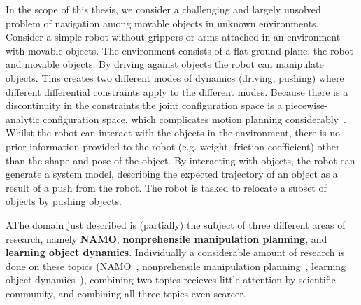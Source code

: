 In the scope of this thesis, we consider a challenging and largely unsolved problem of navigation among movable objects in unknown environments. Consider a simple robot without grippers or arms attached in an environment with movable objects. The environment consists of a flat ground plane, the robot and movable objects. By driving against objects the robot can manipulate objects.\bs
{}
This creates two different modes of dynamics (driving,  pushing) where different differential constraints apply to the different modes. Because there is a discontinuity in the constraints the joint configuration space is a piecewise-analytic configuration space, which complicates motion planning considerably~\cite{vega-brown_asymptotically_2020}. Whilst the robot can interact with the objects in the environment, there is no prior information provided to the robot (e.g. weight, friction coefficient) other than the shape and pose of the object. By interacting with objects, the robot can generate a system model, describing the expected trajectory of an object as a result of a push from the robot. The robot is tasked to relocate a subset of objects by pushing objects. \bs



AThe domain just described is (partially) the subject of three different areas of research, namely \textbf{\ac{NAMO}}, \textbf{nonprehensile manipulation planning}, and \textbf{learning object dynamics}. Individually a considerable amount of research is done on these topics (\ac{NAMO}~\cite{wang_affordancebased_2020,lavalle_planning_2006,elbanhawi_samplingbased_2014,kingston_samplingbased_2018,chen_fast_2018,ellis_navigation_2022}, nonprehensile manipulation planning~\cite{arruda_uncertainty_2017,mericli_pushmanipulation_2015,toussaint_sequenceofconstraints_2022,stuber_let_2020,stuber_featurebased_2018,bauza_dataefficient_2018}, learning object dynamics~\cite{seegmiller_vehicle_2013,cong_selfadapting_2020}), combining two topics recieves little attention by scientific community, and combining all three topics even scarcer.\bs

